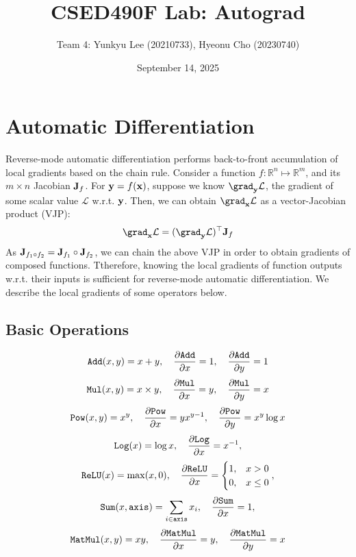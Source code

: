 \documentclass{lucas-report}
\title{CSED490F Lab: Autograd}
\author{Team 4: Yunkyu Lee (20210733), Hyeonu Cho (20230740)}
\date{September 14, 2025}
\begin{document}
\maketitle

\section{Automatic Differentiation}\label{sec:autodiff}

Reverse-mode automatic differentiation performs
back-to-front accumulation of local gradients based on the chain rule.
Consider a function $f : \mathbb{R}^{n} \mapsto \mathbb{R}^m$,
and its $m \times n$ Jacobian $\mathbf{J}_f$.
For $\mathbf{y} = f(\mathbf{x})$, suppose we know $\grad_{\vb{y}}\mathcal{L}$,
the gradient of some scalar value $\mathcal{L}$ w.r.t. $\mathbf{y}$.
Then, we can obtain $\grad_{\vb{x}}\mathcal{L}$ as a vector-Jacobian product (VJP):
\[
  \grad_{\vb{x}}\mathcal{L} = (\grad_{\vb{y}}\mathcal{L})^\top \vb{J}_f
\]
As $\mathbf{J}_{f_1 \circ f_2} = \mathbf{J}_{f_1} \circ \mathbf{J}_{f_2}$,
we can chain the above VJP in order to obtain gradients of composed functions.
Ttherefore, knowing the local gradients of function outputs w.r.t. their inputs
is sufficient for reverse-mode automatic differentiation.
We describe the local gradients of some operators below.

\subsection{Basic Operations}

\begin{equation}
  \texttt{Add}(x, y) = x + y,
  \quad \pdv{\texttt{Add}}{x} = 1,
  \quad \pdv{\texttt{Add}}{y} = 1
\end{equation}
\begin{equation}
  \texttt{Mul}(x, y) = x \times y,
  \quad \pdv{\texttt{Mul}}{x} = y,
  \quad \pdv{\texttt{Mul}}{y} = x
\end{equation}
\begin{equation}
  \texttt{Pow}(x, y) = x^y,
  \quad \pdv{\texttt{Pow}}{x} = yx^{y-1},
  \quad \pdv{\texttt{Pow}}{y} = x^y \log x
\end{equation}
\begin{equation}
  \texttt{Log}(x) = \log x,
  \quad \pdv{\texttt{Log}}{x} = x^{-1},
\end{equation}
\begin{equation}
  \texttt{ReLU}(x) = \max(x, 0),
  \quad \pdv{\texttt{ReLU}}{x} =
  \begin{cases}
    1, & x > 0 \\
    0, & x \leq 0
  \end{cases},
\end{equation}
\begin{equation}
  \texttt{Sum}(x, \texttt{axis}) = \sum_{i \in \texttt{axis}} x_i,
  \quad \pdv{\texttt{Sum}}{x} = 1,
\end{equation}
\begin{equation}
  \texttt{MatMul}(x, y) = xy,
  \quad \pdv{\texttt{MatMul}}{x} = y,
  \quad \pdv{\texttt{MatMul}}{y} = x
\end{equation}
\end{document}
